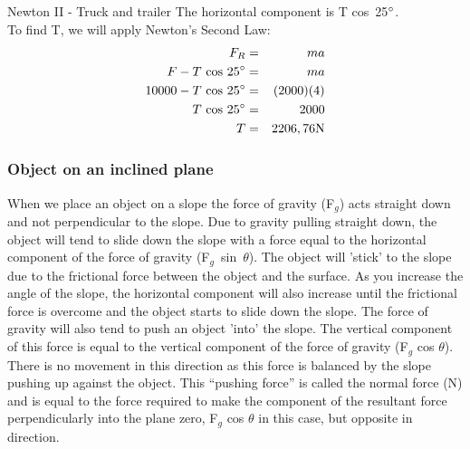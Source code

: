 \begin{wex}{Newton II - Truck and trailer}
{The horizontal component is T cos~25$^{\circ}$.\\

To find T, we will apply Newton's Second Law:\\
\begin{eqnarray*}
F_{R} &=& ma\\
F - T\ \rm{cos}~25^{\circ} &=& ma\\
10 000 - T\ \rm{cos}~25^{\circ} &=& (2000)(4)\\
T\ \rm{cos}~25^{\circ} &=& 2000\\
T &=& 2206,76 \rm{N}
\end{eqnarray*}
}
\end{wex}

\subsubsection{Object on an inclined plane}
When we place an object on a slope the force of gravity (F$_{g}$) acts straight down and not perpendicular to the slope. Due to gravity pulling straight down, the object will tend to slide down the slope with a force equal to the horizontal component of the force of gravity (F$_{g}$~sin~$\theta$). The object will 'stick' to the slope due to the frictional force between the object and the surface. As you increase the angle of the slope, the horizontal component will also increase until the frictional force is overcome and the object starts to slide down the slope.
The force of gravity will also tend to push an object 'into' the slope. The vertical component of this force is equal to the vertical component of the force of gravity (F$_{g}$ cos $\theta$). There is no movement in this direction as this force is balanced by the slope pushing up against the object. This ``pushing force'' is called the normal force (N) and is equal to the force required to make the component of the resultant force perpendicularly into the plane zero, F$_{g}$ cos $\theta$ in this case, but opposite in direction.

